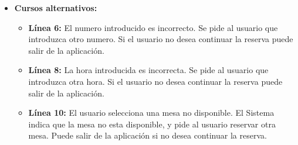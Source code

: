 \documentclass[spanish,a4paper,11pt, twoside]{report}	%
\begin{document}
\begin{itemize}
			\\
			\item \textbf{Cursos alternativos:} 
			\begin{itemize}
			\item  \textbf{Línea 6:} El numero introducido es incorrecto. Se pide al usuario que introduzca otro numero. Si el usuario no desea continuar la reserva puede salir de la aplicación.
			\item  \textbf{Línea 8:} La hora introducida es incorrecta. Se pide al usuario que introduzca otra hora. Si el usuario no desea continuar la reserva puede salir de la aplicación.
			\item  \textbf{Línea 10:} El usuario selecciona una mesa no disponible. El Sistema indica que la mesa no esta disponible, y pide al usuario reservar otra mesa. Puede salir de la aplicación si no desea continuar la reserva.
			\end {itemize}
		\end {itemize}
		
\end{document}

